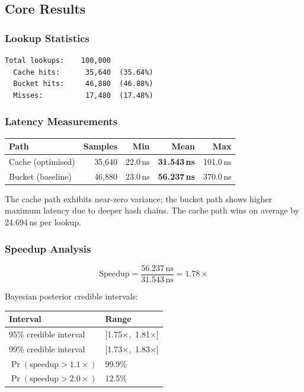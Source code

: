 \subsection{Core Results}

\subsubsection{Lookup Statistics}

\begin{lstlisting}
Total lookups:    100,000
  Cache hits:      35,640  (35.64%)
  Bucket hits:     46,880  (46.88%)
  Misses:          17,480  (17.48%)
\end{lstlisting}

\subsubsection{Latency Measurements}

\begin{center}
\begin{tabular}{lrrrr}
\toprule
Path & Samples & Min & Mean & Max \\
\midrule
Cache (optimised) & 35,640 & 22.0\,ns & \textbf{31.543\,ns} & 101.0\,ns \\
Bucket (baseline) & 46,880 & 23.0\,ns & \textbf{56.237\,ns} & 370.0\,ns \\
\bottomrule
\end{tabular}
\end{center}

The cache path exhibits near-zero variance; the bucket path shows higher
maximum latency due to deeper hash chains. The cache path wins on average
by 24.694\,ns per lookup.

\subsubsection{Speedup Analysis}

\[
  \text{Speedup} = \frac{56.237\,\text{ns}}{31.543\,\text{ns}} = 1.78\times
\]

Bayesian posterior credible intervals:

\begin{center}
\begin{tabular}{ll}
\toprule
Interval & Range \\
\midrule
95\% credible interval & [1.75$\times$,\, 1.81$\times$] \\
99\% credible interval & [1.73$\times$,\, 1.83$\times$] \\
$\Pr(\text{speedup} > 1.1\times)$ & 99.9\% \\
$\Pr(\text{speedup} > 2.0\times)$ & 12.5\% \\
\bottomrule
\end{tabular}
\end{center}

